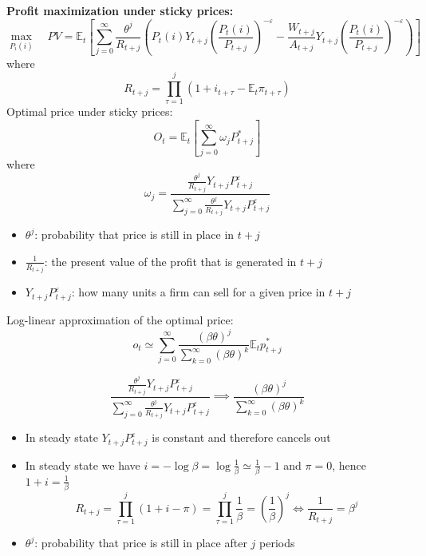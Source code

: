 \documentclass{article}
\begin{document}
\textbf{Profit maximization under sticky prices:}
\begin{equation*}
    \max_{P_i(i)} \quad PV=\mathbb{E}_t\left[
    \sum_{j=0}^{\infty}\frac{\theta^j}{R_{t+j}}
    \left(
    P_t(i)Y_{t+j}\left(\frac{P_t(i)}{P_{t+j}} \right)^{-\varepsilon} -
    \frac{W_{t+j}}{A_{t+j}}Y_{t+j}\left(\frac{P_t(i)}{P_{t+j}} \right)^{-\varepsilon}
    \right)
    \right]
\end{equation*}
where
\begin{equation*}
    R_{t+j}=\prod_{\tau=1}^{j}(1+i_{t+\tau}-\mathbb{E}_t\pi_{t+\tau})
\end{equation*}
Optimal price under sticky prices:
\begin{equation*}
    O_t=\mathbb{E}_t\left[\sum_{j=0}^{\infty}\omega_jP_{t+j}^* \right]
\end{equation*}
where
\begin{equation*}
    \omega_j=\frac{\frac{\theta^j}{R_{t+j}}Y_{t+j}P_{t+j}^{\varepsilon}}{\sum_{j=0}^{\infty}\frac{\theta^j}{R_{t+j}}Y_{t+j}P_{t+j}^{\varepsilon}}
\end{equation*}
\begin{itemize}
    \item $\theta^j$: probability that price is still in place in $t+j$
    \item $\frac{1}{R_{t+j}}$: the present value of the profit that is generated in $t+j$
    \item $Y_{t+j}P_{t+j}^{\varepsilon}$: how many units a firm can sell for a given price in $t+j$
\end{itemize}


Log-linear approximation of the optimal price:
\begin{equation*}
    o_t\simeq\sum_{j=0}^{\infty}\frac{(\beta\theta)^j}{\sum_{k=0}^{\infty}(\beta\theta)^k}\mathbb{E}_tp_{t+j}^*
\end{equation*}

\begin{equation*}
    \frac{\frac{\theta^j}{R_{t+j}}Y_{t+j}P_{t+j}^{\varepsilon}}{\sum_{j=0}^{\infty}\frac{\theta^j}{R_{t+j}}Y_{t+j}P_{t+j}^{\varepsilon}}
    \implies
    \frac{(\beta\theta)^j}{\sum_{k=0}^{\infty}(\beta\theta)^k}
\end{equation*}
\begin{itemize}
    \item In steady state $Y_{t+j}P_{t+j}^{\varepsilon}$ is constant and therefore cancels out
    \item In steady state we have $i=-\log\beta=\log\frac{1}{\beta}\simeq\frac{1}{\beta}-1$ and $\pi=0$, hence $1+i=\frac{1}{\beta}$
    \[R_{t+j}=\prod_{\tau=1}^{j}(1+i-\pi)=\prod_{\tau=1}^{j}\frac{1}{\beta}=\left(\frac{1}{\beta}\right)^j
    \Longleftrightarrow \frac{1}{R_{t+j}}=\beta^j \]
    \item $\theta^j$: probability that price is still in place after $j$ periods
    
\end{itemize}
\end{document}
